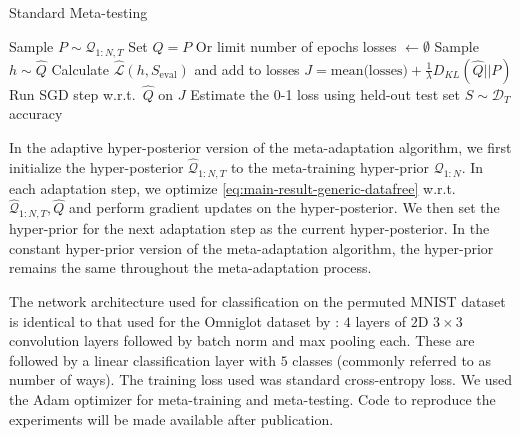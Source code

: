\documentclass{article} %
\theoremstyle{definition}
\newcommand{\RM}[1]{\textcolor{magenta}{\{RM: #1\}}}
\begin{document}
\begin{algorithm}[H]
	\caption{Standard Meta-testing}
	\small
	\begin{algorithmic}
		\State Sample $P\sim \mathcal{Q}_{1:N, T}$
		\State Set $\hat{Q}=P$
		 \Comment Or limit number of epochs
			\State losses $\leftarrow \emptyset$
				\State Sample $h\sim \hat{Q}$
				\State Calculate $\hat{\mathcal{L}}(h,S_{\mathrm{eval}})$ and add to losses
			\EndFor
			\State $J=\textrm{mean(losses)}+\frac{1}{\lambda} D_{KL}(\hat{Q}||P)$
			\State Run SGD step w.r.t.\ $\hat{Q}$ on $J$
		\EndWhile
		\State Estimate the 0-1 loss using held-out test set $S\sim \mathcal{D}_T$
		\State \Return accuracy
		\EndFunction
	\end{algorithmic}
\end{algorithm}

In the adaptive hyper-posterior version of the meta-adaptation algorithm, we first initialize the hyper-posterior $\hat{\mathcal{Q}}_{1:N, T}$ to the meta-training hyper-prior $\mathcal{Q}_{1:N}$. In each adaptation step, we optimize \eqref{eq:main-result-generic-datafree} w.r.t.\! $\hat{\mathcal{Q}}_{1:N, T},\hat{Q}$ and perform gradient updates on the hyper-posterior. We then set the hyper-prior for the next adaptation step as the current hyper-posterior.
In the constant hyper-prior version of the meta-adaptation algorithm, the hyper-prior remains the same throughout the meta-adaptation process.

The network architecture used for classification on the permuted MNIST dataset is identical to that used for the Omniglot dataset by \citet{Vinyals2016}: $4$ layers of $2$D $3\times 3$ convolution layers followed by batch norm and max pooling each. These are followed by a linear classification layer with $5$ classes (commonly referred to as number of ways). The training loss used was standard cross-entropy loss. We used the Adam optimizer \citep{Kingma2015} for meta-training and meta-testing. 
Code to reproduce the experiments will be made available after publication.
\end{document}

